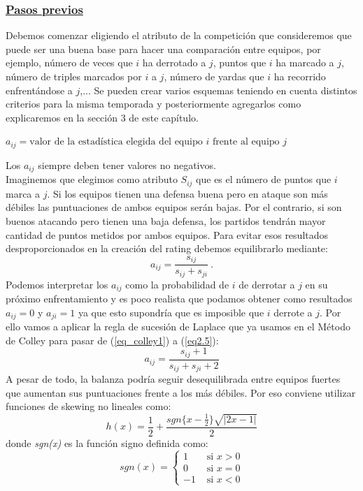 \subsubsection*{\underline{Pasos previos}}
Debemos comenzar eligiendo el atributo de la competición que consideremos que puede ser una buena base para hacer una comparación entre equipos, por ejemplo, número de veces que $i$ ha derrotado a $j$, puntos que $i$ ha marcado a $j$, número de triples marcados por $i$ a $j$, número de yardas que $i$ ha recorrido enfrentándose a $j$,... Se pueden crear varios esquemas teniendo en cuenta distintos criterios para la misma temporada y posteriormente agregarlos como explicaremos en la sección 3 de este capítulo.
\begin{center}
	$a_{ij} = \text{valor de la estadística elegida del equipo }i \text{ frente al equipo } j$
\end{center}
Los $a_{ij}$ siempre deben tener valores no negativos.\\

Imaginemos que elegimos como atributo $S_{ij}$ que es el número de puntos que $i$ marca a $j$. Si los equipos tienen una defensa buena pero en ataque son más débiles las puntuaciones de ambos equipos serán bajas. Por el contrario, si son buenos atacando pero tienen una baja defensa, los partidos tendrán mayor cantidad de puntos metidos por ambos equipos. Para evitar esos resultados desproporcionados en la creación del rating debemos equilibrarlo mediante:
\begin{equation}
a_{ij} = \dfrac{s_{ij}}{s_{ij}+s_{ji}} \ .
\end{equation}
Podemos interpretar los $a_{ij}$ como la probabilidad de $i$ de derrotar a $j$ en su próximo enfrentamiento y es poco realista que podamos obtener como resultados $a_{ij}=0$ y $a_{ji}=1$ ya que esto supondría que es imposible que $i$ derrote a $j$. Por ello vamos a aplicar la regla de sucesión de Laplace que ya usamos en el Método de Colley para pasar de (\ref{eq_colley1}) a (\ref{eq2.5}):
\begin{equation}
a_{ij} = \dfrac{s_{ij}+1}{s_{ij}+s_{ji}+2} \label{formejem6}
\end{equation}
A pesar de todo, la balanza podría seguir desequilibrada entre equipos fuertes que aumentan sus puntuaciones frente a los más débiles. Por eso conviene utilizar funciones de skewing no lineales \cite[pág 31]{cap4} como:
\begin{equation}
h(x) = \frac{1}{2} + \dfrac{sgn\{x-\frac{1}{2}\} \sqrt{|2x-1|}}{2} 
\end{equation} 
donde \textit{sgn(x)} es la función signo definida como:
\begin{equation*}
sgn(x) = \begin{cases}
1 & \text{ si } x>0\\
0 & \text{ si } x=0\\
-1 & \text{ si } x<0 
\end{cases}
\end{equation*}


